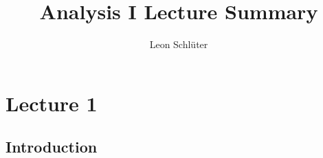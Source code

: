 \documentclass[a4paper,10pt]{article}
\title{Analysis I Lecture Summary}
\author{Leon Schlüter}
\begin{document}
\maketitle
    \section{Lecture 1}
    \subsection{Introduction}
\end{document}

